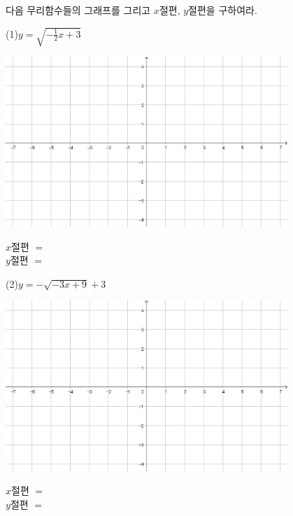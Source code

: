 \documentclass{oblivoir}
\begin{document}
\newpage
%
\prob{}
다음 무리함수들의 그래프를 그리고 \(x\)절편, \(y\)절편을 구하여라.\label{irrational7}
\par\bigskip\noindent
(1)\:\:\(y=\sqrt{-\frac12x+3}\)
\begin{center}
\includegraphics[width=0.8\textwidth]{74grid}
\end{center}
\hspace{0.65\textwidth}\parbox[t]{0.3\textwidth}{\(x\)절편 \(=\)\\\(y\)절편 \(=\)}

(2)\:\:\(y=-\sqrt{-3x+9}+3\)
\begin{center}
\includegraphics[width=0.8\textwidth]{74grid}
\end{center}
\hspace{0.65\textwidth}\parbox[t]{0.3\textwidth}{\(x\)절편 \(=\)\\\(y\)절편 \(=\)}

\end{document}
